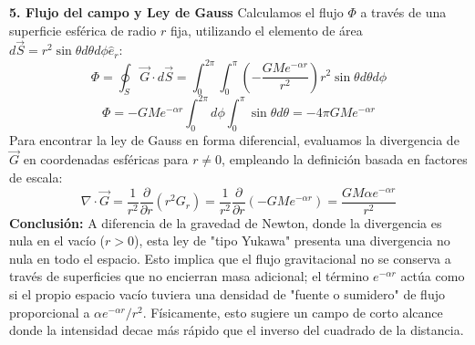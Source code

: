 \documentclass[a4paper]{article}
\begin{document}
\textbf{5. Flujo del campo y Ley de Gauss}
Calculamos el flujo $\Phi$ a través de una superficie esférica de radio $r$ fija, utilizando el elemento de área $d\vec{S} = r^2 \sin \theta d\theta d\phi \hat{e}_r$:
\begin{equation}
\Phi = \oint_S \vec{G} \cdot d\vec{S} = \int_0^{2\pi} \int_0^\pi \left( -\frac{GM e^{-\alpha r}}{r^2} \right) r^2 \sin \theta d\theta d\phi
\end{equation}
\begin{equation}
\Phi = -GM e^{-\alpha r} \int_0^{2\pi} d\phi \int_0^\pi \sin \theta d\theta = -4\pi GM e^{-\alpha r}
\end{equation}
Para encontrar la ley de Gauss en forma diferencial, evaluamos la divergencia de $\vec{G}$ en coordenadas esféricas para $r \neq 0$, empleando la definición basada en factores de escala:
\begin{equation}
\nabla \cdot \vec{G} = \frac{1}{r^2} \frac{\partial}{\partial r}(r^2 G_r) = \frac{1}{r^2} \frac{\partial}{\partial r}(-GM e^{-\alpha r}) = \frac{GM \alpha e^{-\alpha r}}{r^2}
\end{equation}
\textbf{Conclusión:} A diferencia de la gravedad de Newton, donde la divergencia es nula en el vacío ($r > 0$), esta ley de "tipo Yukawa" presenta una divergencia no nula en todo el espacio. Esto implica que el flujo gravitacional no se conserva a través de superficies que no encierran masa adicional; el término $e^{-\alpha r}$ actúa como si el propio espacio vacío tuviera una densidad de "fuente o sumidero" de flujo proporcional a $\alpha e^{-\alpha r} / r^2$. Físicamente, esto sugiere un campo de corto alcance donde la intensidad decae más rápido que el inverso del cuadrado de la distancia.



 
\end{document}
